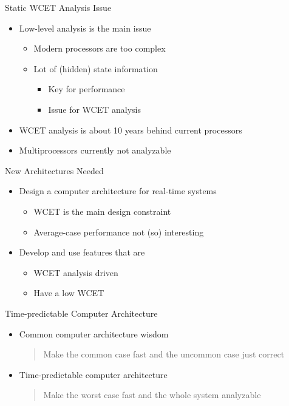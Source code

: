 \documentclass[17pt]{beamer}
\begin{document}
\begin{frame}{Static WCET Analysis Issue}
  \begin{itemize}
  \item Low-level analysis is the main issue
    \begin{itemize}
    \item Modern processors are too complex
    \item Lot of (hidden) state information
      \begin{itemize}
      \item Key for performance
      \item Issue for WCET analysis        
      \end{itemize}      
    \end{itemize}
  \item WCET analysis is about 10 years behind current processors
  \item Multiprocessors currently not analyzable    
  \end{itemize}
\end{frame}

\begin{frame}{New Architectures Needed}
  \begin{itemize}
  \item Design a computer architecture for real-time systems
    \begin{itemize}
    \item WCET is the main design constraint
    \item Average-case performance not (so) interesting
    \end{itemize}
  \item Develop and use features that are
    \begin{itemize}
    \item WCET analysis driven
    \item Have a low WCET      
    \end{itemize}
  \end{itemize}
\end{frame}

\begin{frame}[shrink=5]{\normalsize{Time-predictable Computer Architecture}}
  \begin{itemize}
  \item Common computer architecture wisdom

    \bigskip
    \begin{quote}
      Make the common case fast and the uncommon case just correct
    \end{quote}
  \item Time-predictable computer architecture

    \bigskip
    \begin{quote}
      Make the worst case fast and the whole system analyzable
    \end{quote}
  \end{itemize}  
\end{frame}
\end{document}
